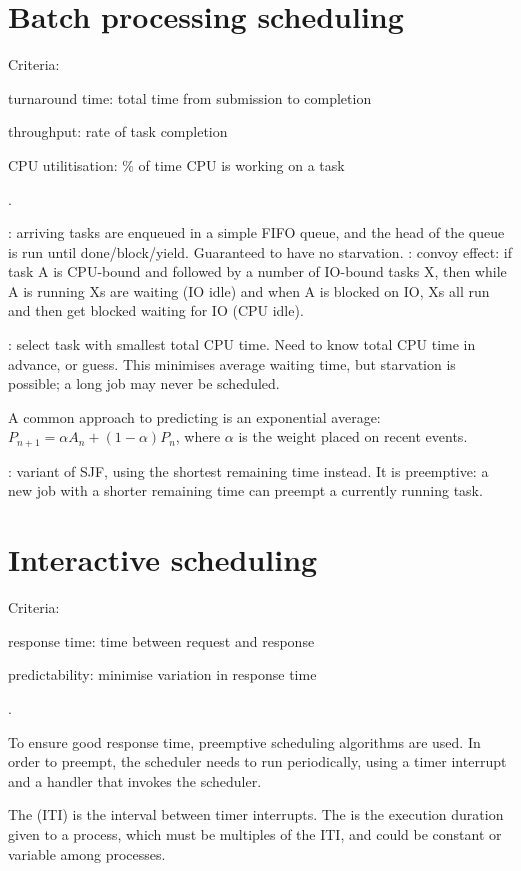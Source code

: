 \documentclass[fontsize=9pt,twoside]{slnotes}
\newcommand\problems{\textsymbol{✗}}
\begin{document}
\section{Batch processing scheduling}
Criteria: \begin{slinenum}
\item turnaround time: total time from submission to completion
\item throughput: rate of task completion
\item CPU utilitisation: \% of time CPU is working on a task
\end{slinenum}.

: arriving tasks are enqueued in a simple FIFO queue, and the head of the queue is run until done/block/yield. Guaranteed to have no starvation. \problems: convoy effect: if task A is CPU-bound and followed by a number of IO-bound tasks X, then while A is running Xs are waiting (IO idle) and when A is blocked on IO, Xs all run and then get blocked waiting for IO (CPU idle).

: select task with smallest total CPU time. Need to know total CPU time in advance, or guess. This minimises average waiting time, but starvation is possible; a long job may never be scheduled.

A common approach to predicting is an exponential average: \(P_{n+1} = \alpha A_n + (1-\alpha) P_n\), where \(\alpha\) is the weight placed on recent events.

: variant of SJF, using the shortest remaining time instead. It is preemptive: a new job with a shorter remaining time can preempt a currently running task.

\section{Interactive scheduling}
Criteria: \begin{slinenum}
\item response time: time between request and response
\item predictability: minimise variation in response time
\end{slinenum}.

To ensure good response time, preemptive scheduling algorithms are used. In order to preempt, the scheduler needs to run periodically, using a timer interrupt and a handler that invokes the scheduler.

The  (ITI) is the interval between timer interrupts. The  is the execution duration given to a process, which must be multiples of the ITI, and could be constant or variable among processes.
\end{document}
